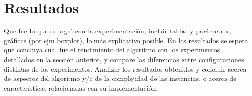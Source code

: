 \section{Resultados}

Que fue lo que se logr\'o con la experimentaci\'on, incluir tablas y par\'ametros, gr\'aficos (por ejm boxplot), lo m\'as explicativo posible. En los resultados se espera que concluya cu\'al fue el rendimiento del algoritmo con los experimentos detallados en la secci\'on anterior, y compare las diferencias entre configuraciones distintas de los experimentos. Analizar los resultados obtenidos y concluir acerca de aspectos del algoritmo y/o de la complejidad de las instancias, o acerca de caracter\'isticas relacionadas con su implementaci\'on.
